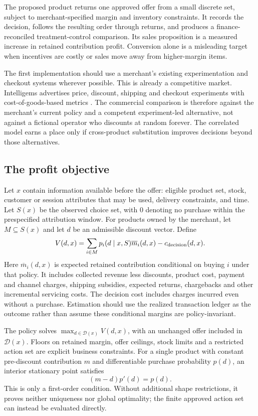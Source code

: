 \documentclass[11pt]{article}
\theoremstyle{remark}\newtheorem{example}{Example}
\begin{document}
The proposed product returns one approved offer from a small discrete set,
subject to merchant-specified margin and inventory constraints. It records the
decision, follows the resulting order through returns, and produces a finance-
reconciled treatment-control comparison. Its sales proposition is a measured
increase in retained contribution profit. Conversion alone is a misleading
target when incentives are costly or sales move away from higher-margin items.

The first implementation should use a merchant's existing experimentation and
checkout systems wherever possible. This is already a competitive market.
Intelligems advertises price, discount, shipping and checkout experiments with
cost-of-goods-based metrics \citep{intelligems}. The commercial comparison is
therefore against the merchant's current policy and a competent experiment-led
alternative, not against a fictional operator who discounts at random forever.
The correlated model earns a place only if cross-product substitution improves
decisions beyond those alternatives.

\subsection{The profit objective}
Let $x$ contain information available before the offer: eligible product set,
stock, customer or session attributes that may be used, delivery constraints,
and time. Let $S(x)$ be the observed choice set, with $0$ denoting no purchase
within the prespecified attribution window. For products owned by the merchant,
let $M\subseteq S(x)$ and let $d$ be an admissible discount vector. Define
\begin{equation}\label{eq:merchant}
 V(d,x)=\sum_{i\in M}p_i(d\mid x,S)
             \overline m_i(d,x)-c_{\rm decision}(d,x).
\end{equation}
Here $\overline m_i(d,x)$ is expected retained contribution conditional on buying
$i$ under that policy. It includes collected revenue less discounts, product
cost, payment and channel charges, shipping subsidies, expected returns,
chargebacks and other incremental servicing costs. The decision cost includes
charges incurred even without a purchase. Estimation should use the realized
transaction ledger as the outcome rather than assume these conditional margins
are policy-invariant.

The policy solves $\max_{d\in\mathcal D(x)}V(d,x)$, with an unchanged offer
included in $\mathcal D(x)$. Floors on retained margin, offer ceilings, stock
limits and a restricted action set are explicit business constraints. For a
single product with constant pre-discount contribution $m$ and differentiable
purchase probability $p(d)$, an interior stationary point satisfies
\begin{equation}
 (m-d)p'(d)=p(d).
\end{equation}
This is only a first-order condition. Without additional shape restrictions,
it proves neither uniqueness nor global optimality; the finite approved action
set can instead be evaluated directly.
\end{document}
